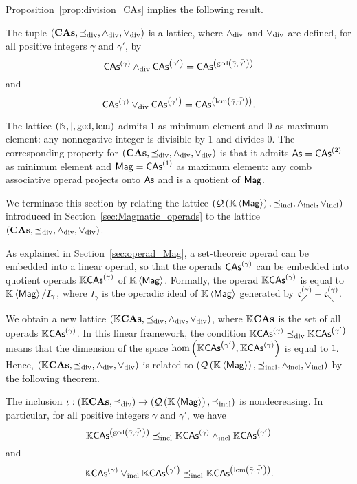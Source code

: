 Proposition~\ref{prop:division_CAs} implies the following result.
\medbreak

\begin{Theorem}\label{thm:lattice_CAs}
  The tuple $\LatCAs$ is a lattice, where $\InfCAs$ and $\SupCAs$ are
  defined, for all positive integers $\gamma$ and $\gamma'$, by
    \begin{equation}
      \CAs{\gamma}\InfCAs\CAs{\gamma'}
      =\CAs{\gcd \left(\bar{\gamma}, \bar{\gamma'}\right)}
    \end{equation}
    and
    \begin{equation}
      \CAs{\gamma}\SupCAs\CAs{\gamma'}
      =\CAs{\lcm \left(\bar{\gamma}, \bar{\gamma'}\right)}.
    \end{equation}
\end{Theorem}
\medbreak

  The lattice $\left(\N,\mid, \gcd, \lcm\right)$ admits $1$ as minimum
  element and $0$ as maximum element: any nonnegative integer is
  divisible by $1$ and divides $0$. The corresponding property for
  $\LatCAs$ is that it admits $\As=\CAs{2}$ as minimum element and $\Mag=
  \CAs{1}$ as maximum element: any comb associative operad projects onto
  $\As$ and is a quotient of $\Mag$.

We terminate this section by relating the lattice
$\LatQMag$ introduced in Section~\ref{sec:Magmatic_operads} to the
lattice $\LatCAs$.

As explained in Section~\ref{sec:operad_Mag}, a set-theoreic operad can
be embedded into a linear operad, so that the operads $\CAs{\gamma}$ can
be embedded into quotient operads $\KCAs{\gamma}$ of $\KMag$. Formally,
the operad $\KCAs{\gamma}$ is equal to $\KMag/I_{\gamma}$, where
$I_{\gamma}$ is the operadic ideal of $\KMag$ generated by
$\LComb{\gamma}-\RComb{\gamma}$.

We obtain a new lattice $\LatKCAs$, where $\KCAsAll$ is the set of all
operads $\KCAs{\gamma}$. In this linear framework, the condition
$\KCAs{\gamma}\OrdCAs\KCAs{\gamma'}$ means that the dimension of the
space $\text{hom}\left(\KCAs{\gamma'},\KCAs{\gamma}\right)$ is equal to
$1$. Hence, $\LatKCAs$ is related to $\LatQMag$ by the following
theorem.

\begin{Theorem}
    The inclusion
    \begin{math}
        \iota:\left(\KCAsAll,\OrdCAs\right)
        \to
        \left(\QMag,\OrdQMag\right)
    \end{math}
    is nondecreasing. In particular, for all positive integers $\gamma$
    and $\gamma'$, we have
    \begin{equation} \label{equ:comparison_of_lattice_operations}
        \KCAs{\gcd \left(\bar{\gamma}, \bar{\gamma'}\right)}
        \OrdQMag
        \KCAs{\gamma}\InfQMag\KCAs{\gamma'}
    \end{equation}
    and
    \begin{equation}
        \KCAs{\gamma}\SupQMag\KCAs{\gamma'}
        \OrdQMag
        \KCAs{\lcm \left(\bar{\gamma}, \bar{\gamma'}\right)}.
    \end{equation}
\end{Theorem}

